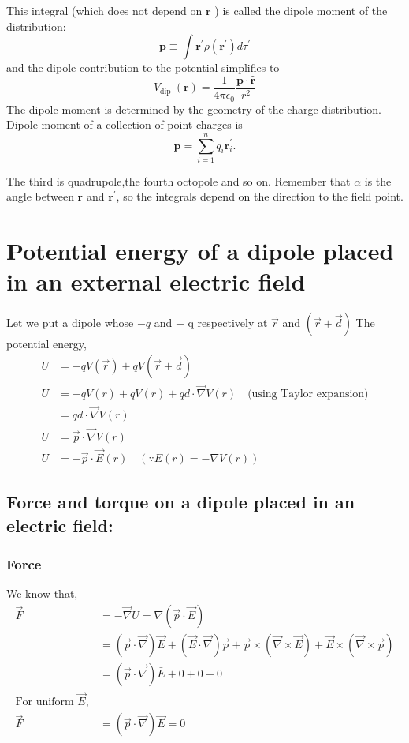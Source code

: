 This integral (which does not depend on $\mathbf{r}$ ) is called the dipole moment of the distribution:
$$
\mathbf{p} \equiv \int \mathbf{r}^{\prime} \rho\left(\mathbf{r}^{\prime}\right) d \tau^{\prime}
$$
and the dipole contribution to the potential simplifies to
$$
V_{\text {dip }}(\mathbf{r})=\frac{1}{4 \pi \epsilon_{0}} \frac{\mathbf{p} \cdot \hat{\mathbf{r}}}{r^{2}}
$$
The dipole moment is determined by the geometry of the charge distribution.\\ Dipole moment of a collection of point charges is
$$
\mathbf{p}=\sum_{i=1}^{n} q_{i} \mathbf{r}_{i}^{\prime} .
$$
\begin{note}
	The third is quadrupole,the fourth octopole and so on. Remember that $\alpha$ is the angle between $\mathbf{r}$ and $\mathbf{r}^{\prime}$, so the integrals depend on the direction to the field point.
\end{note}
\section{Potential energy of a dipole placed in an external electric field}
Let we put a dipole whose $-q$ and $+$ q respectively at $\vec{r}$ and $(\vec{r}+\vec{d})$
The potential energy,
\begin{align*}
U&=-q V(\vec{r})+q V(\vec{r}+\vec{d})\\
U&=-q V(r)+q V(r)+q d \cdot \vec{\nabla} V(r)\quad \text{(using Taylor expansion)}\\
&=q d \cdot \vec{\nabla} V(r) \\
U&=\vec{p} \cdot \vec{\nabla} V(r) \\
U&=-\vec{p} \cdot \vec{E}(r) \quad(\because E(r)=-\nabla V(r))
\end{align*}
\subsection{Force and torque on a dipole placed in an electric field:}
\subsubsection{Force }
We know that,
\begin{align*}
\vec{F} &=-\vec{\nabla} U=\nabla(\vec{p} \cdot \vec{E}) \\
&=(\vec{p} \cdot \vec{\nabla}) \vec{E}+(\vec{E} \cdot \vec{\nabla}) \vec{p}+\vec{p} \times(\vec{\nabla} \times \vec{E})+\vec{E} \times(\vec{\nabla} \times \vec{p}) \\
&=(\vec{p} \cdot \vec{\nabla}) \bar{E}+0+0+0\\
\text{For uniform } \vec{E},\\
\vec{F}&=(\vec{p} \cdot \vec{\nabla}) \vec{E}=0
\end{align*}

